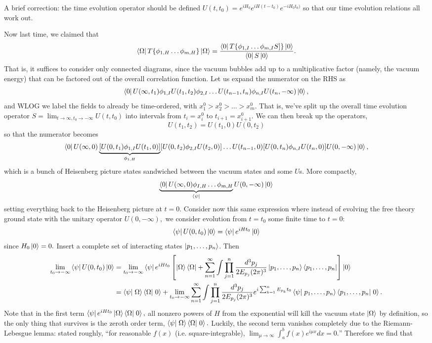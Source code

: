 A brief correction: the time evolution operator should be defined
$U(t,t_0)=e^{iH_0}e^{iH(t-t_0)}e^{-iH_0 t_0)}$ so that our time evolution relations all work out.

Now last time, we claimed that
$$\left< \Omega \right|T\{\phi_{1,H}\ldots \phi_{m,H}\}\left| \Omega \right>=\frac{\left< 0 \right|T \{\phi_{1,I}\ldots \phi_{m,I}S]\}\left| 0 \right>}{\left< 0 \right|S\left| 0 \right>}.$$
That is, it suffices to consider only connected diagrams, since the vacuum bubbles add up to a multiplicative factor (namely, the vacuum energy) that can be factored out of the overall correlation function.
Let us expand the numerator on the RHS as
$$\left< 0 \right|U(\infty, t_1) \phi_{1,I} U(t_1,t_2)\phi_{2,I} \ldots U(t_{n-1},t_n)\phi_{n,I} U(t_n,-\infty)\left| 0 \right>,$$
and WLOG we label the fields to already be time-ordered, with $x_1^0 > x_2^0 > \ldots > x_m^0$. That is, we've split up the overall time evolution operator $S=\lim_{t\to \infty, t_0\to-\infty} U(t,t_0)$ into intervals from $t_i=x_i^0$ to $t_{i+1}=x_{i+1}^0$. We can then break up the operators,
$$U(t_1,t_2)=U(t_1,0)U(0,t_2)$$ so that the numerator becomes
$$\left< 0 \right|U(\infty, 0) \underbrace{[U(0,t_1)\phi_{1,I} U(t_1,0)]}_{\phi_{1,H}} [U(0,t_2)\phi_{2,I} U(t_2,0)]\ldots U(t_{n-1},0)[U(0,t_n)\phi_{n,I} U(t_n,0)]U(0,-\infty)\left| 0 \right>,$$
which is a bunch of Heisenberg picture states sandwiched between the vacuum states and some $U$s.
More compactly,
$$\underbrace{\left< 0 \right|U(\infty,0)\phi_{I,H}\ldots \phi_{m,H}}_{\left< \psi \right|}U(0,-\infty)\left| 0 \right>$$
setting everything back to the Heisenberg picture at $t=0$. Consider now this same expression where instead of evolving the free theory ground state with the unitary operator $U(0,-\infty),$ we consider evolution from $t=t_0$ some finite time to $t=0$:
$$\left< \psi \right|U(0,t_0)\left| 0 \right>=\left< \psi \right|e^{iHt_0}\left| 0 \right>$$
since $H_0\left| 0 \right>=0.$ Insert a complete set of interacting states $\left| p_1,\ldots, p_n \right>$. Then 
\begin{align*}
\lim_{t_0\to-\infty} \bra{\psi}U(0,t_0)\ket{0}&=
\lim_{t_0\to-\infty}\bra{\psi}e^{iHt_0}\left[\ket{\Omega}\bra{\Omega}+\sum_{n=1}^\infty \int  \prod_{j=1}^n \frac{d^3p_j}{2E_{p_j}(2\pi)^3}\ket{p_1,\ldots,p_n}\bra{p_1,\ldots,p_n}\right]\ket{0}\\
&=\braket{\psi}{\Omega}\braket{\Omega}{0}+
\lim_{t_0\to-\infty}\sum_{n=1}^\infty \int  \prod_{j=1}^n \frac{d^3p_j}{2E_{p_j}(2\pi)^3} e^{i\sum_{k=1}^n E_{p_k} t_0}\braket{\psi}{p_1,\ldots,p_n}\braket{p_1,\ldots,p_n}{0}.
\end{align*}
Note that in the first term $\bra{\psi} e^{iHt_0}\ket{\Omega}\braket{\Omega}{0},$ all nonzero powers of $H$ from the exponential will kill the vacuum state $\left| \Omega \right>$ by definition, so the only thing that survives is the zeroth order term, $\braket{\psi}{\Omega}\braket{\Omega}{0}.$ Luckily, the second term vanishes completely due to the Riemann-Lebesgue lemma: stated roughly, ``for reasonable $f(x)$ (i.e. square-integrable), $\lim_{\mu\to\infty} \int_a^b f(x)e^{i\mu x}dx=0.$'' Therefore we find that

